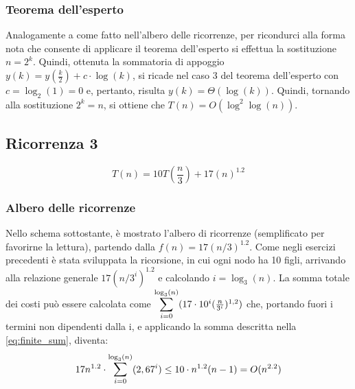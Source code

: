 \documentclass{article}
\begin{document}

\subsubsection{Teorema dell'esperto}
Analogamente a come fatto nell'albero delle ricorrenze, per ricondurci alla forma nota che consente di applicare il teorema dell'esperto si effettua la sostituzione $n = 2^k$. Quindi, ottenuta la sommatoria di appoggio $y(k) = y\left(\frac{k}{2}\right) + c\cdot\log(k)$, si ricade nel caso 3 del teorema dell'esperto con $c=\log_2(1) = 0$ e, pertanto, risulta $y(k) =  \Theta(\log(k))$. Quindi, tornando alla sostituzione $2^k=n$, si ottiene che $T(n) = O(\log^2\log(n))$.

\subsection{Ricorrenza 3}

\begin{equation*}
   T(n) = 10T\left(\frac{n}{3}\right) + 17(n)^{1.2}
\end{equation*}

\subsubsection{Albero delle ricorrenze}

Nello schema sottostante, è mostrato l'albero di ricorrenze (semplificato per favorirne la lettura), partendo dalla $f(n) = 17(n/3)^{1.2}$.
Come negli esercizi precedenti è stata sviluppata la ricorsione, in cui ogni nodo ha 10 figli, arrivando alla relazione generale $17(n/3^i)^{1.2}$ e calcolando $i = \log_3(n)$.
La somma totale dei costi può essere calcolata come $\mathlarger{\sum}_{i=0}^{\log_3(n)} (17\cdot 10^i(\frac{n}{3^i})^{1,2})$ che, portando fuori i termini non dipendenti dalla i, e applicando la somma descritta nella \cref{eq:finite_sum}, diventa:
\begin{equation*}
    17n^{1.2} \cdot \mathlarger{\sum}_{i=0}^{\log_3(n)} (2,67^i) \leq 10 \cdot n^{1.2} (n-1) = O(n^{2.2})
\end{equation*}
\end{document}
